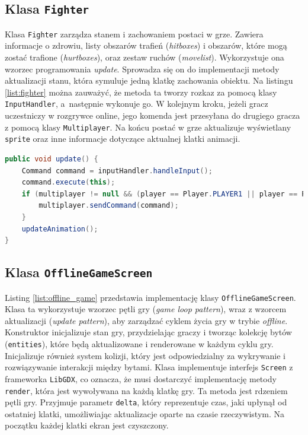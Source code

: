 \subsection{Klasa \texttt{Fighter}}
Klasa \texttt{Fighter} zarządza stanem i zachowaniem postaci w grze. Zawiera informacje o zdrowiu, listy obszarów trafień (\emph{hitboxes}) i obszarów, które mogą zostać trafione (\emph{hurtboxes}), oraz zestaw ruchów (\emph{movelist}). Wykorzystuje ona wzorzec programowania \emph{update}. Sprowadza się on do implementacji metody aktualizacji stanu, która symuluje jedną klatkę zachowania obiektu. Na listingu \ref{list:fighter} można zauważyć, że metoda ta tworzy rozkaz za pomocą klasy \texttt{InputHandler}, a~następnie wykonuje go. W kolejnym kroku, jeżeli gracz uczestniczy w rozgrywce online, jego komenda jest przesyłana do drugiego gracza z pomocą klasy \texttt{Multiplayer}. Na końcu postać w grze aktualizuje wyświetlany \texttt{sprite} oraz inne informacje dotyczące aktualnej klatki animacji.

\begin{lstlisting}[language=Java,style=JavaStyle,label=list:fighter,caption=Funkcja update w klasie Fighter,
                   basicstyle=\footnotesize\ttfamily]
public void update() {
    Command command = inputHandler.handleInput();
    command.execute(this);
    if (multiplayer != null && (player == Player.PLAYER1 || player == Player.PLAYER2)) {
        multiplayer.sendCommand(command);
    }
    updateAnimation();
}
\end{lstlisting}

\subsection{Klasa \texttt{OfflineGameScreen}}
Listing \ref{list:offline_game} przedstawia implementację klasy \texttt{OfflineGameScreen}. Klasa ta wykorzystuje wzorzec pętli gry (\emph{game loop pattern}), wraz z wzorcem aktualizacji (\emph{update pattern}), aby zarządzać cyklem życia gry w trybie \emph{offline}. Konstruktor inicjalizuje stan gry, przydzielając graczy i tworząc kolekcję bytów (\texttt{entities}), które będą aktualizowane i renderowane w każdym cyklu gry. Inicjalizuje również system kolizji, który jest odpowiedzialny za wykrywanie i rozwiązywanie interakcji między bytami. Klasa implementuje interfejs \texttt{Screen} z frameworka \texttt{LibGDX}, co oznacza, że musi dostarczyć implementację metody \texttt{render}, która jest wywoływana na każdą klatkę gry. Ta metoda jest rdzeniem pętli gry. Przyjmuje parametr \texttt{delta}, który reprezentuje czas, jaki upłynął od ostatniej klatki, umożliwiając aktualizacje oparte na czasie rzeczywistym. Na początku każdej klatki ekran jest czyszczony. 

